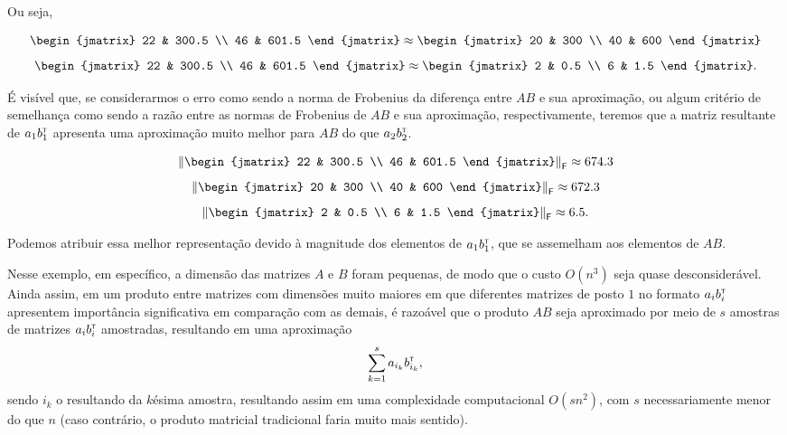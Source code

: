 Ou seja,

\[
  \begin{jmatrix}
    22 & 300.5 \\ 46 & 601.5
  \end{jmatrix}
  \approx
  \begin{jmatrix}
    20 & 300 \\ 40 & 600
  \end{jmatrix}
\]
\[
  \begin{jmatrix}
    22 & 300.5 \\ 46 & 601.5
  \end{jmatrix}
  \approx
  \begin{jmatrix}
    2 & 0.5 \\ 6 & 1.5
  \end{jmatrix}.
\]

É visível que, se considerarmos o erro como sendo a norma de Frobenius da diferença entre $AB$ e sua aproximação, ou algum critério de semelhança como sendo a razão entre as normas de Frobenius de $AB$ e sua aproximação, respectivamente, teremos que a matriz resultante de $a_1b_1^{\scriptscriptstyle\mathsf{T}\mkern-1mu}$ apresenta uma aproximação muito melhor para $AB$ do que $a_2b_2^{\scriptscriptstyle\mathsf{T}\mkern-1mu}$.

\[\fnorm{\begin{jmatrix}
    22 & 300.5 \\ 46 & 601.5
  \end{jmatrix}}
  \approx
  674.3
\]
\[\fnorm{\begin{jmatrix}
    20 & 300 \\ 40 & 600
  \end{jmatrix}}
  \approx 672.3
\]
\[
\fnorm{\begin{jmatrix}
    2 & 0.5 \\ 6 & 1.5
  \end{jmatrix}}
  \approx 6.5.
\]

Podemos atribuir essa melhor representação devido à magnitude dos elementos de $a_1 b_1^{\scriptscriptstyle\mathsf{T}\mkern-1mu}$, que se assemelham aos elementos de $AB$.

Nesse exemplo, em específico, a dimensão das matrizes $A$ e $B$ foram pequenas, de modo que o custo $O(n^3)$ seja quase desconsiderável. Ainda assim, em um produto entre matrizes com dimensões muito maiores em que diferentes matrizes de posto $1$ no formato $a_ib_i^{\scriptscriptstyle\mathsf{T}\mkern-1mu}$ apresentem importância significativa em comparação com as demais, é razoável que o produto $AB$ seja aproximado por meio de $s$ amostras de matrizes $a_ib_i^{\scriptscriptstyle\mathsf{T}\mkern-1mu}$ amostradas, resultando em uma aproximação \[\sum_{k=1}^{s} a_{i_{k}} b_{i_{k}}^{\scriptscriptstyle\mathsf{T}\mkern-1mu},\] sendo $i_k$ o resultando da $k$ésima amostra, resultando assim em uma complexidade computacional $O(sn^2)$, com $s$ necessariamente menor do que $n$ (caso contrário, o produto matricial tradicional faria muito mais sentido).


